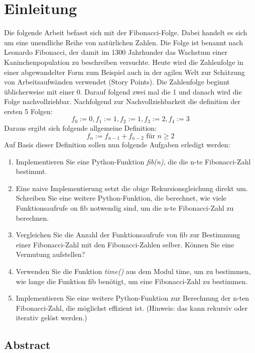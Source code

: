 \section{Einleitung}
Die folgende Arbeit befasst sich mit der Fibonacci-Folge. 
Dabei handelt es sich um eine unendliche Reihe von natürlichen Zahlen.
Die Folge ist benannt nach Leonardo Fibonacci, 
der damit im 1300 Jahrhunder das Wachstum einer Kaninchenpopulation zu beschreiben versuchte.
Heute wird die Zahlenfolge in einer abgewandelter Form zum Beispiel auch
in der agilen Welt zur Schätzung von Arbeitsaufwänden verwendet (Story Points).
Die Zahlenfolge beginnt üblicherweise mit einer 0.
Darauf folgend zwei mal die 1 und danach wird die Folge nachvollziehbar.
Nachfolgend zur Nachvollziehbarkeit die definition der ersten 5 Folgen:
\begin{equation}
  f_0 := 0,
  f_1 := 1,
  f_2 := 1,
  f_3 := 2,
  f_4 := 3
\end{equation}
Daraus ergibt sich folgende allgemeine Definition:
\begin{equation}
  f_n := f_{n-1} + f_{n-2} \text{ für } n \ge 2
\end{equation}
Auf Basis dieser Definition sollen nun folgende Aufgaben
erledigt werden:
\begin{enumerate}
  \item Implementieren Sie eine Python-Funktion \textit{fib(n)}, die die n-te Fibonacci-Zahl bestimmt.
  \item Eine naive Implementierung setzt die obige Rekursionsgleichung direkt um. Schreiben Sie eine weitere Python-Funktion, die berechnet, wie viele Funktionsaufrufe on fib notwendig sind, um die n-te Fibonacci-Zahl zu berechnen.
  \item Vergleichen Sie die Anzahl der Funktionsaufrufe von fib zur Bestimmung einer Fibonacci-Zahl mit den Fibonacci-Zahlen selber. Können Sie eine Vermutung aufstellen?
  \item Verwenden Sie die Funktion \textit{time()} aus dem Modul time, um zu bestimmen, wie lange die Funktion fib benötigt, um eine Fibonacci-Zahl zu bestimmen.
  \item Implementieren Sie eine weitere Python-Funktion zur Berechnung der n-ten Fibonacci-Zahl, die möglichst effizient ist. (Hinweis: das kann rekursiv oder iterativ gelöst werden.)
\end{enumerate}
\subsection{Abstract}
